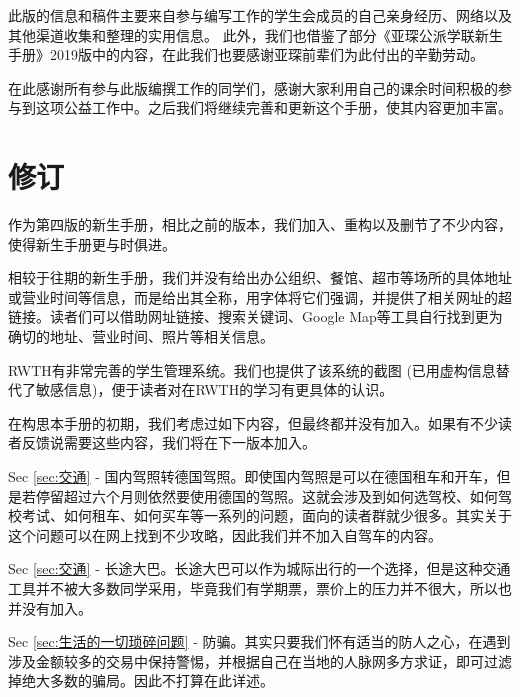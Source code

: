   此版的信息和稿件主要来自参与编写工作的学生会成员的自己亲身经历、网络以及其他渠道收集和整理的实用信息。 此外，我们也借鉴了部分《亚琛公派学联新生手册》2019版中的内容，在此我们也要感谢亚琛前辈们为此付出的辛勤劳动。

  在此感谢所有参与此版编撰工作的同学们，感谢大家利用自己的课余时间积极的参与到这项公益工作中。之后我们将继续完善和更新这个手册，使其内容更加丰富。



  \newpage

\chapter*{修订}


  作为第四版的新生手册，相比之前的版本，我们加入、重构以及删节了不少内容，使得新生手册更与时俱进。

  相较于往期的新生手册，我们并没有给出办公组织、餐馆、超市等场所的具体地址或营业时间等信息，而是给出其全称，用字体将它们强调，并提供了相关网址的超链接。读者们可以借助网址链接、搜索关键词、Google Map等工具自行找到更为确切的地址、营业时间、照片等相关信息。

  RWTH有非常完善的学生管理系统。我们也提供了该系统的截图 (已用虚构信息替代了敏感信息)，便于读者对在RWTH的学习有更具体的认识。

  在构思本手册的初期，我们考虑过如下内容，但最终都并没有加入。如果有不少读者反馈说需要这些内容，我们将在下一版本加入。

  Sec \ref{sec:交通} - 国内驾照转德国驾照。即使国内驾照是可以在德国租车和开车，但是若停留超过六个月则依然要使用德国的驾照。这就会涉及到如何选驾校、如何驾校考试、如何租车、如何买车等一系列的问题，面向的读者群就少很多。其实关于这个问题可以在网上找到不少攻略，因此我们并不加入自驾车的内容。

  Sec \ref{sec:交通} - 长途大巴。长途大巴可以作为城际出行的一个选择，但是这种交通工具并不被大多数同学采用，毕竟我们有学期票，票价上的压力并不很大，所以也并没有加入。

  Sec \ref{sec:生活的一切琐碎问题} - 防骗。其实只要我们怀有适当的防人之心，在遇到涉及金额较多的交易中保持警惕，并根据自己在当地的人脉网多方求证，即可过滤掉绝大多数的骗局。因此不打算在此详述。
